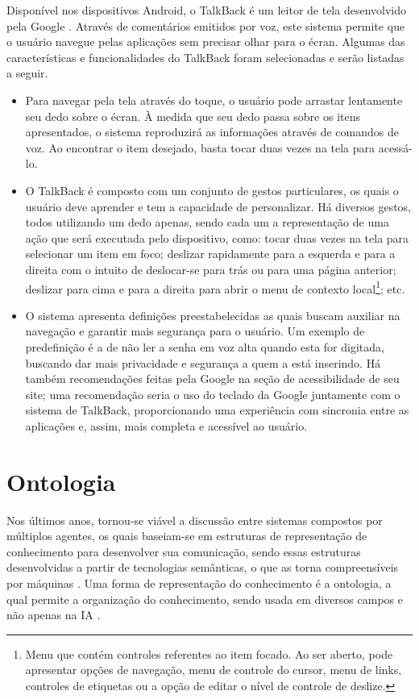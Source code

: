 Disponível nos dispositivos Android, o TalkBack é um leitor de tela desenvolvido pela Google \cite{TALKB2016}. Através de comentários emitidos por voz, este sistema permite que o usuário navegue pelas aplicações sem precisar olhar para o écran. Algumas das características e funcionalidades do TalkBack foram selecionadas e serão listadas a seguir.
\begin{itemize}
	\item Para navegar pela tela através do toque, o usuário pode arrastar lentamente seu dedo sobre o écran. À medida que seu dedo passa sobre os itens apresentados, o sistema reproduzirá as informações através de comandos de voz. Ao encontrar o item desejado, basta tocar duas vezes na tela para acessá-lo.
	\item O TalkBack é composto com um conjunto de gestos particulares, os quais o usuário deve aprender e tem a capacidade de personalizar. Há diversos gestos, todos utilizando um dedo apenas, sendo cada um a representação de uma ação que será executada pelo dispositivo, como: tocar duas vezes na tela para selecionar um item em foco; deslizar rapidamente para a esquerda e para a direita com o intuito de deslocar-se para trás ou para uma página anterior; deslizar para cima e para a direita para abrir o menu de contexto local\footnote{Menu que contém controles referentes ao item focado. Ao ser aberto, pode apresentar opções de navegação, menu de controle do cursor, menu de links, controles de etiquetas ou a opção de editar o nível de controle de deslize.}; etc.
	\item O sistema apresenta definições preestabelecidas as quais buscam auxiliar na navegação e garantir mais segurança para o usuário. Um exemplo de predefinição é a de não ler a senha em voz alta quando esta for digitada, buscando dar mais privacidade e segurança a quem a está inserindo. Há também recomendações feitas pela Google na seção de acessibilidade de seu site; uma recomendação seria o uso do teclado da Google juntamente com o sistema de TalkBack, proporcionando uma experiência com sincronia entre as aplicações e, assim, mais completa e acessível ao usuário.
\end{itemize}

\section{Ontologia}

Nos últimos anos, tornou-se viável a discussão entre sistemas compostos por múltiplos agentes, os quais baseiam-se em estruturas de representação de conhecimento para desenvolver sua comunicação, sendo essas estruturas desenvolvidas a partir de tecnologias semânticas, o que as torna compreensíveis por máquinas \cite{godert2014}. Uma forma de representação do conhecimento é a ontologia, a qual permite a organização do conhecimento, sendo usada em diversos campos e não apenas na IA \cite{ONTOLOGIAI}.

